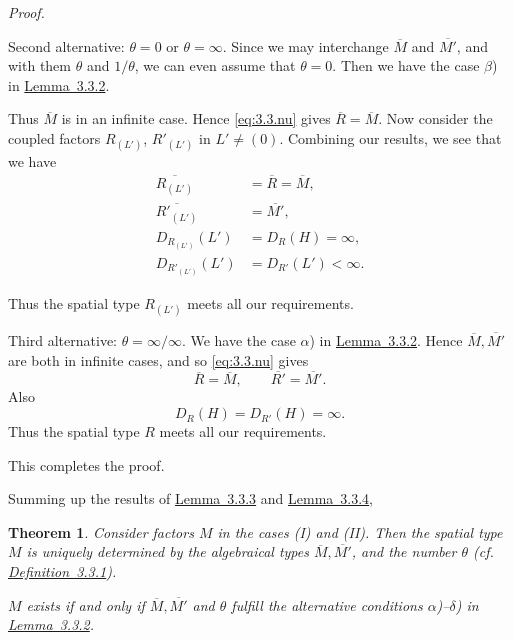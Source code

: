 \documentclass[b5paper,twoside]{article}
\newcommand{\lemref}[2]{\hyperref[#1]{\mbox{Lemma~#2}}}
\newcommand{\defref}[2]{\hyperref[#1]{\mbox{Definition~#2}}}
\theoremstyle{mvnplain}
\newtheorem{theorem}{Theorem}
\renewenvironment{proof}[1][Proof]{%
  \par\addvspace{0.35\baselineskip}%
  \noindent\textit{#1.}\ \normalfont\ignorespaces
}{%
  \par\addvspace{0.35\baselineskip}%
}
\newcommand{\M}{\mathbf M}
\newcommand{\R}{\mathbf R}
\newcommand{\Hilbert}{\mathfrak H}
\def\M{M}%
\def\R{R}%
\def\Hilbert{H}%
\def\widetilde#1{#1}%
\def\mathfrak#1{#1}%
\begin{document}
\begin{proof}
Second alternative: \(\theta=0\) or \(\theta=\infty\). Since we may
interchange \(\overline{\M}\) and \(\overline{\M'}\), and with them
\(\theta\) and \(1/\theta\), we can even assume that \(\theta=0\). Then we
have the case \(\beta\)) in \lemref{lem:3.3.2}{3.3.2}.

Thus \(\overline{\M}\) is in an infinite case. Hence \eqref{eq:3.3.nu} gives
\(\overline{\R}=\overline{\M}\). Now consider the coupled factors
\(\R_{(\mathfrak L')}\), \(\R'_{(\mathfrak L')}\) in
\(\mathfrak L'\ne(0)\). Combining our results, we see that we have
\[
\begin{aligned}
\overline{\R_{(\mathfrak L')}}&=\overline{\R}=\overline{\M},\\
\overline{\R'_{(\mathfrak L')}}&=\overline{\M'},\\
D_{\R_{(\mathfrak L')}}(\mathfrak L')&=D_{\R}(\Hilbert)=\infty,\\
D_{\R'_{(\mathfrak L')}}(\mathfrak L')&=D_{\R'}(\mathfrak L')<\infty.
\end{aligned}
\]

Thus the spatial type \(\widetilde{\R}_{(\mathfrak L')}\) meets all our
requirements.

Third alternative: \(\theta=\infty/\infty\). We have the case \(\alpha\)) in
\lemref{lem:3.3.2}{3.3.2}. Hence \(\overline{\M},\overline{\M'}\) are both
in infinite cases, and so \eqref{eq:3.3.nu} gives
\[
  \overline{\R}=\overline{\M},
  \qquad
  \overline{\R'}=\overline{\M'}.
\]
Also
\[
  D_{\R}(\Hilbert)=D_{\R'}(\Hilbert)=\infty.
\]
Thus the spatial type \(\widetilde{\R}\) meets all our requirements.

This completes the proof.
\end{proof}

Summing up the results of \lemref{lem:3.3.3}{3.3.3} and
\lemref{lem:3.3.4}{3.3.4},

\begin{theorem}\label{thm:X}
Consider factors \(\M\) in the cases (I) and (II). Then the spatial type
\(\widetilde{\M}\) is uniquely determined by the algebraical types
\(\overline{\M},\overline{\M'}\), and the number \(\theta\) (cf.
\defref{def:3.3.1}{3.3.1}).

\(\widetilde{\M}\) exists if and only if \(\overline{\M},\overline{\M'}\)
and \(\theta\) fulfill the alternative conditions \(\alpha\))--\(\delta\)) in
\lemref{lem:3.3.2}{3.3.2}.
\end{theorem}
\end{document}
